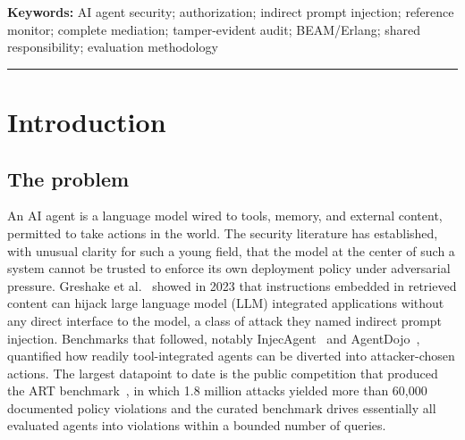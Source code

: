 \documentclass[11pt,letterpaper]{article}
\begin{document}
\begin{abstract}
the approval interface has been done. The implementation passes 1,286 automated test blocks across 287 test files at commit \texttt{79bfd54}, which is a conformance result and not a security result. A reads-only production soak is in progress with no results yet. The paper's contribution is an architecture, a threat model, a stated invariant, an accountability map, and an evaluation design pre-registered here and executed separately, whose primary metric is unauthorized-effect rate rather than model misbehavior.
\end{abstract}

\vspace{0.5em}
\noindent\textbf{Keywords:} AI agent security; authorization; indirect prompt injection; reference monitor; complete mediation; tamper-evident audit; BEAM/Erlang; shared responsibility; evaluation methodology

\vspace{0.8em}
\hrule
\vspace{1.2em}

\section{Introduction}\label{sec:intro}

\subsection{The problem}\label{sec:intro-problem}

An AI agent is a language model wired to tools, memory, and external content, permitted to take actions in the world. The security literature has established, with unusual clarity for such a young field, that the model at the center of such a system cannot be trusted to enforce its own deployment policy under adversarial pressure. Greshake et al.~\cite{greshake2023} showed in 2023 that instructions embedded in retrieved content can hijack large language model (LLM) integrated applications without any direct interface to the model, a class of attack they named indirect prompt injection. Benchmarks that followed, notably InjecAgent~\cite{zhan2024} and AgentDojo~\cite{debenedetti2024}, quantified how readily tool-integrated agents can be diverted into attacker-chosen actions. The largest datapoint to date is the public competition that produced the ART benchmark~\cite{zou2025}, in which 1.8 million attacks yielded more than 60,000 documented policy violations and the curated benchmark drives essentially all evaluated agents into violations within a bounded number of queries.
\end{document}

